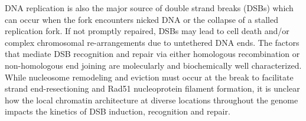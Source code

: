 
DNA replication is also the major source of double strand breaks (DSBs) which can occur when the fork encounters nicked DNA or the collapse of a stalled replication fork\citep{Munoz2017-mi}.
If not promptly repaired, DSBs may lead to cell death and/or complex chromosomal re-arrangements due to untethered DNA ends\cite{Morgan1998,Hinnen1978}.  
The factors that mediate DSB recognition and repair via either homologous recombination or non-homologous end joining are molecularly and biochemically well characterized\cite{Symington2011}.
While nucleosome remodeling and eviction must occur at the break to facilitate strand end-resectioning and Rad51 nucleoprotein filament formation\cite{Renkawitz2014}, it is unclear how the local chromatin architecture at diverse locations throughout the genome impacts the kinetics of DSB induction, recognition and repair.

